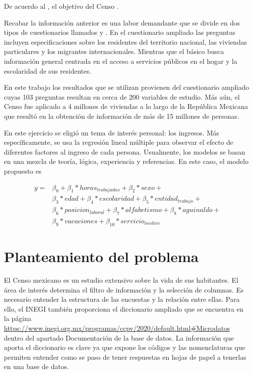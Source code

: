 De acuerdo al \cite{censo_ref}, el objetivo del Censo .

Recabar la información anterior es una labor demandante que se divide en dos tipos de cuestionarios llamados  y . En el cuestionario ampliado las preguntas incluyen especificaciones sobre los residentes del territorio nacional, las viviendas particulares y los migrantes internacionales. Mientras que el básico busca información general centrada en el acceso a servicios públicos en el hogar y la escolaridad de sus residentes. 

En este trabajo los resultados que se utilizan provienen del cuestionario ampliado cuyas 103 preguntas resultan en cerca de 200 variables de estudio. Más aún, el Censo fue aplicado a 4 millones de viviendas a lo largo de la República Mexicana que resultó en la obtención de información de más de 15 millones de personas.

En este ejercicio se eligió un tema de interés personal: los ingresos. Más específicamente, se usa la regresión lineal múltiple para observar el efecto de diferentes factores al ingreso de cada persona. Usualmente, los modelos se basan en una mezcla de teoría, lógica, experiencia y referencias. En este caso, el modelo propuesto es 


\begin{equation} \label{modelo_final}
    \begin{aligned}
    	y =& \beta_0 + \beta_1*horas_{trabajadas} + \beta_2*sexo + \\
    	&\beta_3*edad + \beta_4*escolaridad + \beta_5*entidad_{trabajo} + \\ &\beta_6*posicion_{laboral} + \beta_7*alfabetismo + \beta_8*aguinaldo + \\ &\beta_9*vacaciones + \beta_{10}*servicio_{medico}
    \end{aligned}
\end{equation}


\section{Planteamiento del problema}
El Censo mexicano es un estudio extensivo sobre la vida de sus habitantes. El área de interés determina el filtro de información y la selección de columnas. Es necesario entender la estructura de las encuestas y la relación entre ellas. Para ello, el INEGI también proporciona el diccionario ampliado que se encuentra en la página \url{https://www.inegi.org.mx/programas/ccpv/2020/default.html#Microdatos} dentro del apartado \textsf{Documentación de la base de datos}. La información que aporta el diccionario es clave ya que expone los códigos y las nomenclaturas que permiten entender como se paso de tener respuestas en hojas de papel a tenerlas en una base de datos.

